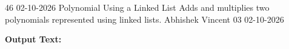 \clearpage
\label{prog:46}
\programhead
  {46}
  {02-10-2026}
  {Polynomial Using a Linked List}
  {Adds and multiplies two polynomials represented using linked lists.}
  {Abhishek Vincent}
  {03}
  {02-10-2026}

\divider
\textbf{Output Text:}\par
\vspace{2pt}

